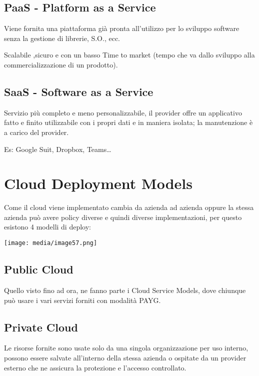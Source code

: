 \subsection{PaaS - Platform as a
Service}\label{paas---platform-as-a-service}

Viene fornita una piattaforma già pronta all'utilizzo per lo sviluppo
software senza la gestione di librerie, S.O., ecc.

Scalabile ,sicuro e con un basso Time to market (tempo che va dallo
sviluppo alla commercializzazione di un prodotto).

\subsection{\texorpdfstring{SaaS - Software as a Service
}{SaaS - Software as a Service }}\label{saas---software-as-a-service}

Servizio più completo e meno personalizzabile, il provider offre un
applicativo fatto e finito utilizzabile con i propri dati e in maniera
isolata; la manutenzione è a carico del provider.

Es: Google Suit, Dropbox, Teams\ldots{}

\section{Cloud Deployment Models}\label{cloud-deployment-models}

Come il cloud viene implementato cambia da azienda ad azienda oppure la
stessa azienda può avere policy diverse e quindi diverse
implementazioni, per questo esistono 4 modelli di deploy:

\texttt{[image: media/image57.png]}

\subsection{Public Cloud}\label{public-cloud}

Quello visto fino ad ora, ne fanno parte i Cloud Service Models, dove
chiunque può usare i vari servizi forniti con modalità PAYG.

\subsection{Private Cloud}\label{private-cloud}

Le risorse fornite sono usate solo da una singola organizzazione per uso
interno, possono essere salvate all'interno della stessa azienda o
ospitate da un provider esterno che ne assicura la protezione e
l'accesso controllato.

